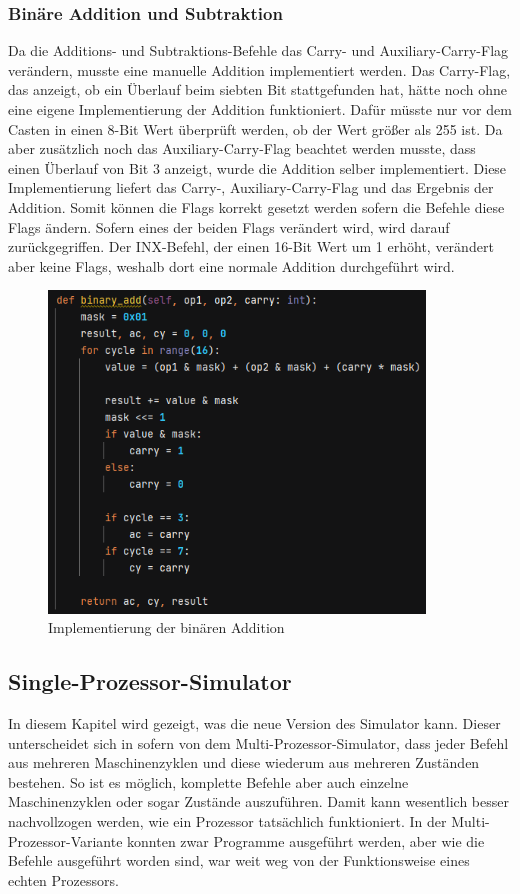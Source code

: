 \documentclass[12pt]{article}
\newcommand{\imgSpaceBefore}{\vspace{10pt}}
\begin{document}
\subsubsection{Binäre Addition und Subtraktion}
Da die Additions- und Subtraktions-Befehle das Carry- und Auxiliary-Carry-Flag verändern, musste eine manuelle Addition implementiert werden. Das Carry-Flag, das anzeigt, ob ein Überlauf beim siebten Bit stattgefunden hat, hätte noch ohne eine eigene Implementierung der Addition funktioniert. Dafür müsste nur vor dem Casten in einen 8-Bit Wert überprüft werden, ob der Wert größer als 255 ist. Da aber zusätzlich noch das Auxiliary-Carry-Flag beachtet werden musste, dass einen Überlauf von Bit 3 anzeigt, wurde die Addition selber implementiert. Diese Implementierung liefert das Carry-, Auxiliary-Carry-Flag und das Ergebnis der Addition. Somit können die Flags korrekt gesetzt werden sofern die Befehle diese Flags ändern. Sofern eines der beiden Flags verändert wird, wird darauf zurückgegriffen. Der INX-Befehl, der einen 16-Bit Wert um 1 erhöht, verändert aber keine Flags, weshalb dort eine normale Addition durchgeführt wird.

\imgSpaceBefore
\begin{figure}[H]
\centering
\includegraphics[width=10cm]{Bilder/binaere_addition}
\caption{Implementierung der binären Addition}
\label{fig:binaere_addition}
\end{figure}

\subsection{Single-Prozessor-Simulator}
\label{SPS_impl}

\noindent
In diesem Kapitel wird gezeigt, was die neue Version des Simulator kann. Dieser unterscheidet sich in sofern von dem Multi-Prozessor-Simulator, dass jeder Befehl aus mehreren Maschinenzyklen und diese wiederum aus mehreren Zuständen bestehen. So ist es möglich, komplette Befehle aber auch einzelne Maschinenzyklen oder sogar Zustände auszuführen. Damit kann wesentlich besser nachvollzogen werden, wie ein Prozessor tatsächlich funktioniert. In der Multi-Prozessor-Variante konnten zwar Programme ausgeführt werden, aber wie die Befehle ausgeführt worden sind, war weit weg von der Funktionsweise eines echten Prozessors.
\end{document}
